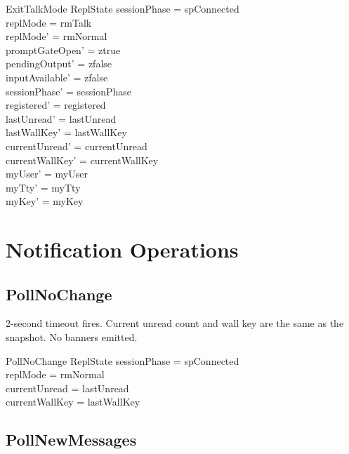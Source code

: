 \documentclass[a4paper,10pt,fleqn]{article}
\begin{document}
\begin{schema}{ExitTalkMode}
  \Delta ReplState
\where
  sessionPhase = spConnected \\
  replMode = rmTalk \\
  replMode' = rmNormal \\
  promptGateOpen' = ztrue \\
  pendingOutput' = zfalse \\
  inputAvailable' = zfalse \\
  sessionPhase' = sessionPhase \\
  registered' = registered \\
  lastUnread' = lastUnread \\
  lastWallKey' = lastWallKey \\
  currentUnread' = currentUnread \\
  currentWallKey' = currentWallKey \\
  myUser' = myUser \\
  myTty' = myTty \\
  myKey' = myKey
\end{schema}

\section{Notification Operations}

\subsection{PollNoChange}

2-second timeout fires.  Current unread count and wall key are the
same as the snapshot.  No banners emitted.

\begin{schema}{PollNoChange}
  \Xi ReplState
\where
  sessionPhase = spConnected \\
  replMode = rmNormal \\
  currentUnread = lastUnread \\
  currentWallKey = lastWallKey
\end{schema}

\subsection{PollNewMessages}
\end{document}
